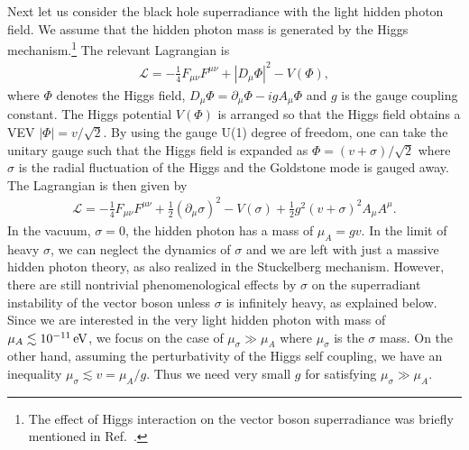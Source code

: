 \documentclass[%
 preprint,
 nofootinbib,
 amsmath,amssymb,
 aps,
 a4paper
]{revtex4-1}
\begin{document}
Next let us consider the black hole superradiance with the light hidden photon field. We assume that the hidden photon mass is generated by the Higgs mechanism.\footnote{
	The effect of Higgs interaction on the vector boson superradiance was briefly mentioned in Ref.~\cite{Baryakhtar:2017ngi}.  
} The relevant Lagrangian is
\begin{align}
	\mathcal L =  -\frac{1}{4}F_{\mu\nu}F^{\mu\nu} + |D_\mu\Phi|^2-V(\Phi) ,
\end{align}
where $\Phi$ denotes the Higgs field, $D_\mu \Phi = \partial_\mu\Phi-ig A_\mu \Phi$ and $g$ is the gauge coupling constant. The Higgs potential $V(\Phi)$ is arranged so that the Higgs field obtains a VEV $|\Phi|=v/\sqrt{2}$. By using the gauge U(1) degree of freedom, one can take the unitary gauge such that the Higgs field is expanded as $\Phi = (v + \sigma)/\sqrt{2}$ where $\sigma$ is the radial fluctuation of the Higgs and the Goldstone mode is gauged away. The Lagrangian is then given by
\begin{align}
	\mathcal L =  -\frac{1}{4}F_{\mu\nu}F^{\mu\nu} +\frac{1}{2}(\partial_\mu \sigma)^2-V(\sigma) +\frac{1}{2}g^2(v+ \sigma)^2 A_\mu A^\mu.
\end{align}
In the vacuum, $\sigma=0$, the hidden photon has a mass of $\mu_A = gv$. 
In the limit of heavy $\sigma$, we can neglect the dynamics of $\sigma$ and we are left with just a massive hidden photon theory, as also realized in the Stuckelberg mechanism. However,  there are still nontrivial phenomenological effects by $\sigma$ on the superradiant instability of the vector boson unless $\sigma$ is infinitely heavy, as explained below. Since we are interested in the very light hidden photon with mass of $\mu_A \lesssim 10^{-11}\,{\rm eV}$, we focus on the case of $\mu_\sigma \gg \mu_A$ where $\mu_\sigma$ is the $\sigma$ mass.
On the other hand, assuming the perturbativity of the Higgs self coupling, we have an inequality $\mu_\sigma \lesssim v = \mu_A/g$. Thus we need very small $g$ for satisfying $\mu_\sigma \gg \mu_A$.
\end{document}

